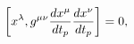 \begin{equation}
\left[ x^{\lambda },g^{\mu \nu }\frac{dx^{\mu }}{dt_{p}}\frac{dx^{\nu }}{%
dt_{p}}\right] =0,
\end{equation}

